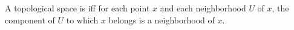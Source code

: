 A topological space is  iff for each point $x$ and each neighborhood $U$ of $x$, the component of $U$ to which $x$ belongs is a neighborhood of $x$.
